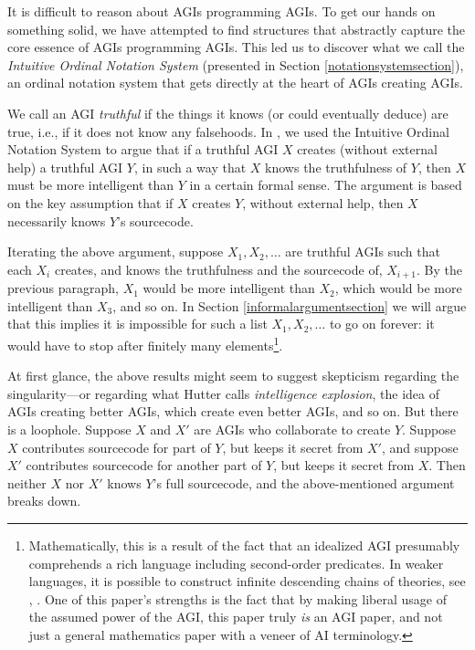 \documentclass[runningheads]{llncs}
\begin{document}
It is difficult to reason about AGIs programming AGIs. To get our hands on something solid,
we have attempted to find structures that abstractly capture the core essence of
AGIs programming AGIs. This led us to discover
what we call the \emph{Intuitive Ordinal Notation System} (presented in Section
\ref{notationsystemsection}), an ordinal notation system that gets directly at
the heart of AGIs creating AGIs.

We call an AGI \emph{truthful} if the things it knows (or could eventually deduce) are true,
i.e., if it does not know any falsehoods.
In \cite{alexander2019measuring}, we used the Intuitive Ordinal Notation System to argue
that if a truthful AGI $X$ creates (without external help) a truthful AGI $Y$, in such a way
that $X$ knows the truthfulness of $Y$, then $X$ must be more intelligent than $Y$
in a certain formal sense. The argument is based on the key assumption that if $X$
creates $Y$, without external help, then $X$ necessarily knows $Y$'s sourcecode.

Iterating the above argument, suppose $X_1,X_2,\ldots$
are truthful AGIs such that each $X_i$ creates, and knows the truthfulness and
the sourcecode of, $X_{i+1}$. By the previous paragraph, $X_1$ would be more
intelligent than $X_2$, which would be more
intelligent than $X_3$, and so on.
In Section \ref{informalargumentsection} we will argue that this implies
it is impossible for such
a list $X_1,X_2,\ldots$ to go on forever: it would have to stop after finitely
many elements\footnote{Mathematically, this is a result of the fact that an
idealized AGI presumably comprehends a rich language including second-order
predicates. In weaker languages, it is possible to construct
infinite descending chains of theories, see \cite{kripke2019ungroundedness},
\cite{visser2002semantics}.
One of this paper's strengths is the fact that by making liberal usage of
the assumed power of the AGI, this paper truly \emph{is} an AGI paper, and
not just a general mathematics paper with a veneer of AI terminology.}.

At first glance, the above results might
seem to suggest skepticism regarding the singularity---or regarding
what Hutter \cite{hutter2012} calls \emph{intelligence explosion}, the idea of
AGIs creating better AGIs, which create even better AGIs, and so on.
But there is a loophole. Suppose $X$ and $X'$ are AGIs
who collaborate to create $Y$. Suppose $X$ contributes sourcecode for
part of $Y$, but keeps it secret from $X'$, and suppose $X'$ contributes
sourcecode for another part of $Y$, but keeps it secret from $X$. Then neither
$X$ nor $X'$ knows $Y$'s full sourcecode, and the above-mentioned argument
breaks down.
\end{document}
